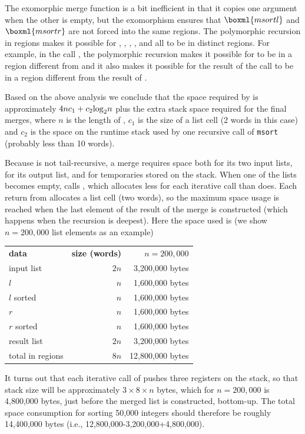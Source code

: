 \documentclass[12pt]{book}
\begin{document}
The exomorphic merge function is a bit inefficient in that it copies
one argument when the other is empty, but the exomorphism ensures that
$\boxml{msort l}$ and $\boxml{msort r}$ are not forced into the same
regions. The polymorphic recursion in regions makes it possible for
, , , , and 
all to be in distinct regions. For example, in the call , the polymorphic recursion makes it possible for  to be
in a region different from  and it also makes it possible for
the result of the call to be in a region different from the result of
.

Based on the above analysis we conclude that the space required by
 is approximately $4nc_1+c_2{\rm log}_2n$ plus the extra
stack space required for the final merges, where $n$ is
the length of , $c_1$ is the size of a list cell (2 words in this
case) and $c_2$ is the space on the runtime stack used by one recursive call
of {\tt msort} (probably less than 10 words).

Because  is not tail-recursive, a merge requires space
both for its two input lists, for its output list, and for temporaries stored on the stack.  When one of the
lists becomes empty,  calls , which allocates
less for each iterative call than  does. Each return from
 allocates a list cell (two words), so the maximum space
usage is reached when the last element of the result of the merge is
constructed (which happens when the recursion is deepest). Here the
space used is (we show $n = 200,000$ list elements as an example)
\begin{center}
\begin{tabular}{lrr}
{\bf data} & {\bf size (words)} &$n=200,000$\\
input list& $2n$ & 3,200,000 bytes\\
$l$ & $n$ & 1,600,000 bytes\\
$l$ sorted & $n$ & 1,600,000 bytes\\
$r$ & $n$ & 1,600,000 bytes\\
$r$ sorted & $n$ & 1,600,000 bytes\\
result list & $2n$ & 3,200,000 bytes\\ \hline
total in regions& $8n$ & 12,800,000 bytes
\end{tabular}
\end{center}

It turns out that each iterative call of  pushes three
registers on the stack, so that stack size will be approximately
$3\times 8\times n$ bytes, which for $n=200,000$ is 4,800,000 bytes,
just before the merged list is constructed, bottom-up. The total space
consumption for sorting 50,000 integers should therefore be roughly
14,400,000 bytes (i.e., 12,800,000-3,200,000+4,800,000).
\end{document}
